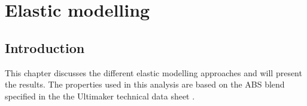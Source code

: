 \chapter{Elastic modelling}
\label{chp:Elasticmodelling}
\graphicspath{{chapter_6_Elasticmodelling/figures/chapter_6.tex}}%

\section{Introduction}
This chapter discusses the different elastic modelling approaches and will present the results. The properties used in this analysis are based on the ABS blend specified in the the Ultimaker technical data sheet \cite{Ultimaker2018TechnicalABS}.


